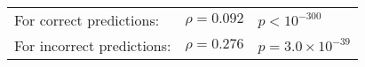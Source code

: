 \begin{tabular}{l l l}
For correct predictions: & $\rho = 0.092$ & $p < 10^{-300}$ \\
For incorrect predictions: & $\rho = 0.276$ & $p = 3.0 \times 10^{-39}$ \\
\end{tabular}
